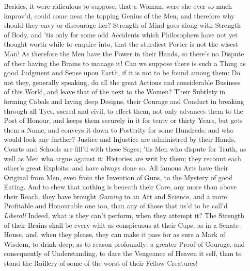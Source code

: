 Besides, it were ridiculous to suppose, that a Woman, were she ever so
much improv'd, could come near the  topping Genius of the
Men, and therefore why should they envy or discourage her? Strength of
Mind goes along with Strength of Body, and 'tis only for some odd
Accidents which Philosophers have not yet thought worth while to
enquire into, that the sturdiest Porter is not the wisest Man! As
therefore the Men have the Power in their Hands, so there's no Dispute
of their having the Brains to manage it! Can we suppose there is such
a Thing as good Judgment and Sense upon Earth, if it is not to be
found among them: Do not they, generally speaking, do all the great
Actions and considerable Business of this World, and leave that of the
next to the Women? Their Subtlety in forming Cabals and laying deep
Designs, their Courage and Conduct in breaking through all Tyes,
sacred and civil, to effect them, not only advances them to the Post
of Honour, and keeps them securely in it for tenty or thirty Years,
but gets them a Name, and conveys it down to Posterity for some
Hundreds; and who would look  any further? Justice and
Injustice are administred by their Hands, Courts and Schools are
fill'd with these Sages; 'tis Men who dispute for Truth, as well as
Men who argue against it: Histories are writ by them; they recount
each other's great Exploits, and have always done so. All famous Arts
have their Original from Men, even from the Invention of Guns, to the
Mystery of good Eating. And to shew that nothing is beneath their
Care, any more than above their Reach, they have brought
\textit{Gaming} to an Art and Science, and a more Profitable and
Honourable one too, than any of those that us'd to be call'd
\textit{Liberal!} Indeed, what is they can't perform, when they
attempt it? The Strength of their Brains shall be every whit as
conspicuous at their Cups, as in a Senate-House, and, when they
please, they can make it pass for as sure a Mark of Wisdom, to drink
deep, as to reason profoundly; a greater Proof of Courage, and
consequently of Understanding, to dare the Vengeance of Heaven it
self,  than to stand the Raillery of some of the worst of
their Fellow Creatures!

